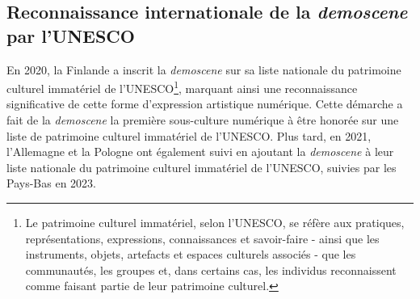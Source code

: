 \subsection*{Reconnaissance internationale de la \textit{demoscene} par l'UNESCO}

En 2020, la Finlande a inscrit la \textit{demoscene} sur sa liste nationale du patrimoine culturel immatériel de l'UNESCO\footnote{Le
 patrimoine culturel immatériel, selon l'UNESCO, se réfère aux 
pratiques, représentations, expressions, connaissances et savoir-faire -
 ainsi que les instruments, objets, artefacts et espaces culturels 
associés - que les communautés, les groupes et, dans certains cas, les 
individus reconnaissent comme faisant partie de leur patrimoine 
culturel.}, marquant ainsi une reconnaissance significative de cette forme d'expression artistique numérique. Cette démarche a fait de la \textit{demoscene} la première sous-culture numérique à être honorée sur une liste de patrimoine culturel immatériel de l'UNESCO. Plus tard, en 2021, l'Allemagne et la Pologne ont également suivi en 
ajoutant la \textit{demoscene} à leur liste nationale du patrimoine culturel immatériel de l'UNESCO, suivies par les Pays-Bas en 2023.

\newpage
